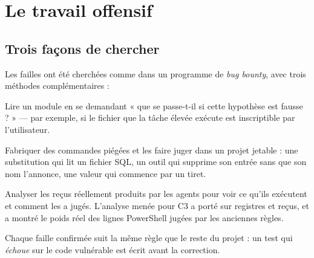 \section{Le travail offensif}
\label{sec:offensif}

\subsection{Trois façons de chercher}
Les failles ont été cherchées comme dans un programme de \textit{bug bounty}, avec trois
méthodes complémentaires :
\begin{description}[style=nextline,leftmargin=0.6cm,font=\sffamily\bfseries]
  \item[La lecture de code] Lire un module en se demandant « que se passe-t-il si cette
    hypothèse est fausse ? » --- par exemple, si le fichier que la tâche élevée exécute est
    inscriptible par l'utilisateur.
  \item[Les sondes] Fabriquer des commandes piégées et les faire juger dans un projet jetable :
    une substitution qui lit un fichier SQL, un outil qui supprime son entrée sans que son
    nom l'annonce, une valeur qui commence par un tiret.
  \item[La fouille des registres] Analyser les reçus réellement produits par les agents pour
    voir ce qu'ils exécutent et comment \demo{} les a jugés. L'analyse menée pour C3 a porté
    sur \nbregistres{} registres et \nbrecus{} reçus, et a montré le poids réel des lignes
    PowerShell jugées par les anciennes règles.
\end{description}
Chaque faille confirmée suit la même règle que le reste du projet : un test qui \emph{échoue}
sur le code vulnérable est écrit avant la correction.

